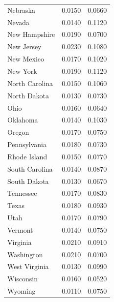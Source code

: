 \begin{table}[H]
\begin{tabular}{lcc}
        Nebraska & 0.0150 & 0.0660 \\
        Nevada & 0.0140 & 0.1120 \\
        New Hampshire & 0.0190 & 0.0700 \\
        New Jersey & 0.0230 & 0.1080 \\
        New Mexico & 0.0170 & 0.1020 \\
        New York & 0.0190 & 0.1120 \\
        North Carolina & 0.0150 & 0.1060 \\
        North Dakota & 0.0130 & 0.0730 \\
        Ohio & 0.0160 & 0.0640 \\
        Oklahoma & 0.0140 & 0.1030 \\
        Oregon & 0.0170 & 0.0750 \\
        Pennsylvania & 0.0180 & 0.0730 \\
        Rhode Island & 0.0150 & 0.0770 \\
        South Carolina & 0.0140 & 0.0870 \\
        South Dakota & 0.0130 & 0.0670 \\
        Tennessee & 0.0170 & 0.0830 \\
        Texas & 0.0180 & 0.0930 \\
        Utah & 0.0170 & 0.0790 \\
        Vermont & 0.0140 & 0.0750 \\
        Virginia & 0.0210 & 0.0910 \\
        Washington & 0.0210 & 0.0700 \\
        West Virginia & 0.0130 & 0.0990 \\
        Wisconsin & 0.0160 & 0.0520 \\
        Wyoming & 0.0110 & 0.0750 \\
        \bottomrule
    \end{tabular}
\end{table}

